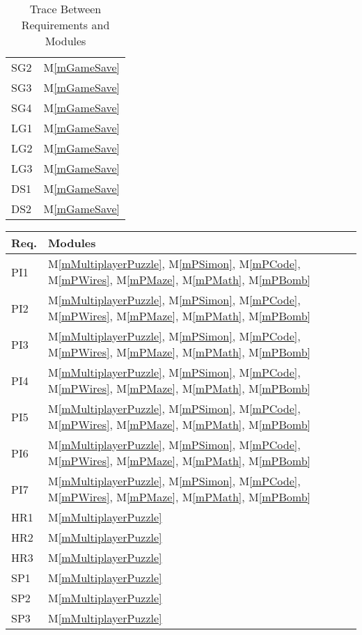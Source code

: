 \documentclass[12pt, titlepage]{article}
\newcommand{\mref}[1]{M\ref{#1}}
\begin{document}
\begin{table}[H]
\begin{tabular}{p{} p{}}
SG2 & \mref{mGameSave}\\
SG3 & \mref{mGameSave}\\
SG4 & \mref{mGameSave}\\
LG1 & \mref{mGameSave}\\
LG2 & \mref{mGameSave}\\
LG3 & \mref{mGameSave}\\
DS1 & \mref{mGameSave}\\
DS2 & \mref{mGameSave}\\
\bottomrule
\end{tabular}
\caption{Trace Between Requirements and Modules}
\label{TblRT}
\end{table}

\begin{table}[H]
\centering
\begin{tabular}{p{} p{}}
\toprule
\textbf{Req.} & \textbf{Modules}\\
\midrule
PI1 & \mref{mMultiplayerPuzzle}, \mref{mPSimon}, \mref{mPCode}, \mref{mPWires}, \mref{mPMaze}, \mref{mPMath}, \mref{mPBomb} \\
PI2 & \mref{mMultiplayerPuzzle}, \mref{mPSimon}, \mref{mPCode}, \mref{mPWires}, \mref{mPMaze}, \mref{mPMath}, \mref{mPBomb}\\
PI3 & \mref{mMultiplayerPuzzle}, \mref{mPSimon}, \mref{mPCode}, \mref{mPWires}, \mref{mPMaze}, \mref{mPMath}, \mref{mPBomb}\\
PI4 & \mref{mMultiplayerPuzzle}, \mref{mPSimon}, \mref{mPCode}, \mref{mPWires}, \mref{mPMaze}, \mref{mPMath}, \mref{mPBomb}\\
PI5 & \mref{mMultiplayerPuzzle}, \mref{mPSimon}, \mref{mPCode}, \mref{mPWires}, \mref{mPMaze}, \mref{mPMath}, \mref{mPBomb}\\
PI6 & \mref{mMultiplayerPuzzle}, \mref{mPSimon}, \mref{mPCode}, \mref{mPWires}, \mref{mPMaze}, \mref{mPMath}, \mref{mPBomb}\\
PI7 & \mref{mMultiplayerPuzzle}, \mref{mPSimon}, \mref{mPCode}, \mref{mPWires}, \mref{mPMaze}, \mref{mPMath}, \mref{mPBomb}\\
HR1 & \mref{mMultiplayerPuzzle}\\
HR2 & \mref{mMultiplayerPuzzle}\\
HR3 & \mref{mMultiplayerPuzzle}\\
SP1 & \mref{mMultiplayerPuzzle}\\
SP2 & \mref{mMultiplayerPuzzle}\\
SP3 & \mref{mMultiplayerPuzzle}\\

\end{tabular}
\end{table}
\end{document}
